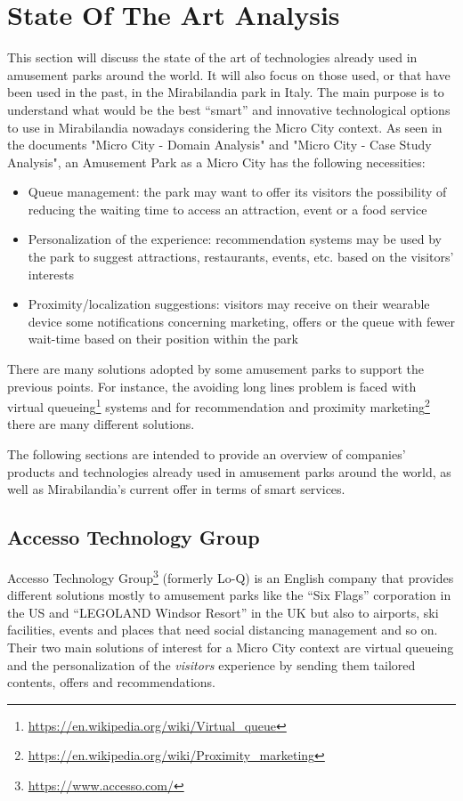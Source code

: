 \section{State Of The Art Analysis}\label{sec:state-of-the-art-analysis}
This section will discuss the state of the art of technologies already used in amusement parks around the world.
It will also focus on those used, or that have been used in the past, in the Mirabilandia park in Italy.
The main purpose is to understand what would be the best ``smart'' and innovative technological options to use in Mirabilandia nowadays considering the Micro City context.
As seen in the documents "Micro City - Domain Analysis" and "Micro City - Case Study Analysis", an Amusement Park as a Micro City has the following necessities:
\begin{itemize}
    \item Queue management: the park may want to offer its visitors the possibility of reducing the waiting time to access an attraction, event or a food service
    \item Personalization of the experience: recommendation systems may be used by the park to suggest attractions, restaurants, events, etc. based on the visitors' interests
    \item Proximity/localization suggestions: visitors may receive on their wearable device some notifications concerning marketing, offers or the queue with fewer wait-time based on their position within the park
\end{itemize}

There are many solutions adopted by some amusement parks to support the previous points.
For instance, the avoiding long lines problem is faced with virtual queueing\footnote{\url{https://en.wikipedia.org/wiki/Virtual_queue}} systems
and for recommendation and proximity marketing\footnote{\url{https://en.wikipedia.org/wiki/Proximity_marketing}} there are many different solutions.

The following sections are intended to provide an overview of companies' products and technologies already used in amusement parks around the world,
as well as Mirabilandia's current offer in terms of smart services.

\subsection{Accesso Technology Group}\label{subsec:accesso-technology-group}
Accesso Technology Group\footnote{\url{https://www.accesso.com/}} (formerly Lo-Q) is an English company that provides different solutions
mostly to amusement parks like the ``Six Flags'' corporation in the US and ``LEGOLAND Windsor Resort'' in the UK but also to airports,
ski facilities, events and places that need social distancing management and so on.
Their two main solutions of interest for a Micro City context are virtual queueing and the personalization of
the \textit{visitors} experience by sending them tailored contents, offers and recommendations.

